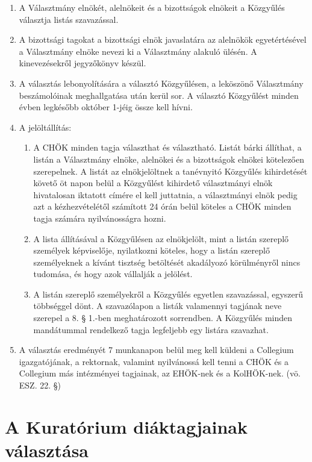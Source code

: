 \documentclass{../styles/rulebook}
\begin{document}
\begin{enumerate}
	\item A Választmány elnökét, alelnökeit és a bizottságok elnökeit a Közgyűlés választja listás szavazással.
	\item A bizottsági tagokat a bizottsági elnök javaslatára az alelnökök egyetértésével a Választmány elnöke nevezi ki a Választmány alakuló ülésén. A kinevezésekről jegyzőkönyv készül.
	\item A választás lebonyolítására a választó Közgyűlésen, a leköszönő Választmány beszámolóinak meghallgatása után kerül sor. A választó Közgyűlést minden évben legkésőbb október 1-jéig össze kell hívni.
	\item A jelöltállítás:
	\begin{enumerate}
		\item A CHÖK minden tagja választhat és választható. Listát bárki állíthat, a listán a Választmány elnöke, alelnökei és a bizottságok elnökei kötelezően szerepelnek. A listát az elnökjelöltnek a tanévnyitó Közgyűlés kihirdetését követő öt napon belül a Közgyűlést kihirdető választmányi elnök hivatalosan iktatott címére el kell juttatnia, a választmányi elnök pedig azt a kézhezvételétől számított 24 órán belül köteles a CHÖK minden tagja számára nyilvánosságra hozni.
		\item A lista állításával a Közgyűlésen az elnökjelölt, mint a listán szereplő személyek képviselője, nyilatkozni köteles, hogy a listán szereplő személyeknek a kívánt tisztség betöltését akadályozó körülményről nincs tudomása, és hogy azok vállalják a jelölést.
		\item A listán szereplő személyekről a Közgyűlés egyetlen szavazással, egyszerű többséggel dönt. A szavazólapon a listák valamennyi tagjának neve szerepel a 8. § 1.-ben meghatározott sorrendben. A Közgyűlés minden mandátummal rendelkező tagja legfeljebb egy listára szavazhat.
	\end{enumerate}
	\item A választás eredményét 7 munkanapon belül meg kell küldeni a Collegium igazgatójának, a rektornak, valamint nyilvánossá kell tenni a CHÖK és a Collegium más intézményei tagjainak, az EHÖK-nek és a KolHÖK-nek. (vö. ESZ. 22. §)
\end{enumerate}


\section{A Kuratórium diáktagjainak választása}
\end{document}
